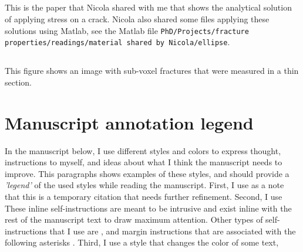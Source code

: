 \documentclass[11pt,titlepage]{article}
\begin{document}
\subsection{\cite{Maugis1992}}
This is the paper that Nicola shared with me that shows the analytical solution of applying stress on a crack. Nicola also shared some files applying these solutions using Matlab, see the Matlab file \texttt{PhD/Projects/fracture properties/readings/material shared by Nicola/ellipse}.
 
\subsection{\cite[see fig. 6]{Ketcham2001}} 
This figure shows an image with sub-voxel fractures that were measured in a thin section.
\clearpage
\newpage



\pagebreak
\appendix
{}
\section*{Manuscript annotation legend}
In the manuscript below, I use different styles and colors to express thought, instructions to myself, and ideas about what I think the manuscript needs to improve. This paragraphs shows examples of these styles, and should provide a \emph{'legend'} of the used styles while reading the manuscript. First, I use  as a note that this is a temporary citation that needs further refinement. Second, I use  These inline self-instructions are meant to be intrusive and exist inline with the rest of the manuscript text to draw maximum attention. Other types of self-instructions that I use are , and margin instructions that are associated with the following asterisks . Third, I use a style that changes the color of some text, 
\end{document}
